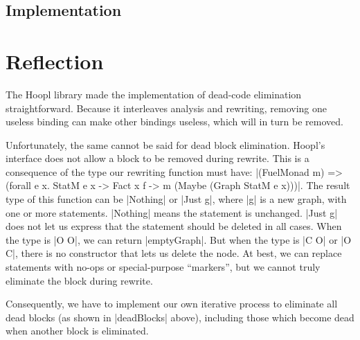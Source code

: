 \documentclass[12pt]{report}
\begin{document}
\subsection*{Implementation}


\section{Reflection}

The Hoopl library made the implementation of dead-code elimination
straightforward. Because it interleaves analysis and rewriting,
removing one useless binding can make other bindings useless, which
will in turn be removed.




Unfortunately, the same cannot be said for dead block
elimination. Hoopl's interface does not allow a block to be removed
during rewrite. This is a consequence of the type our rewriting
function must have: |(FuelMonad m) => (forall e x. StatM e x -> Fact x
f -> m (Maybe (Graph StatM e x)))|.  The result type of this function
can be |Nothing| or |Just g|, where |g| is a new graph, with one or
more statements. |Nothing| means the statement is unchanged. |Just g|
does not let us express that the statement should be deleted in all
cases. When the type is |O O|, we can return |emptyGraph|. But when
the type is |C O| or |O C|, there is no constructor that lets us
delete the node. At best, we can replace statements with no-ops or
special-purpose ``markers'', but we cannot truly eliminate the block
during rewrite.


Consequently, we have to implement our own iterative process to
eliminate all dead blocks (as shown in |deadBlocks| above), including
those which become dead when another block is eliminated.
\end{document}
